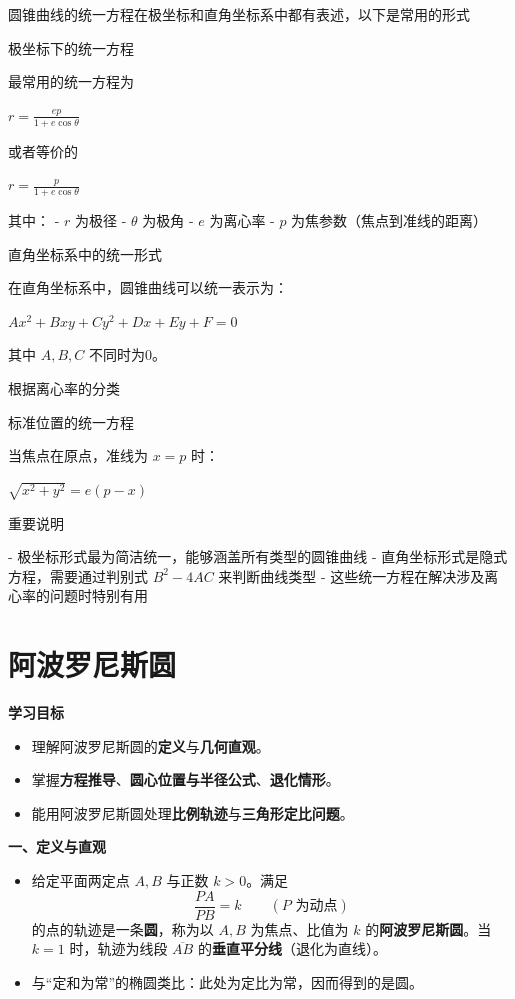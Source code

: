 \documentclass{ctexart}
\begin{document}
   圆锥曲线的统一方程在极坐标和直角坐标系中都有表述，以下是常用的形式
   
    极坐标下的统一方程
   
   最常用的统一方程为
   
  
   $ r = \frac{ep}{1 + e\cos\theta}$
   
   
   或者等价的
   
   $r = \frac{p}{1 + e\cos\theta} $
   
   其中：
   - $r$ 为极径
   - $\theta$ 为极角
   - $e$ 为离心率
   - $p$ 为焦参数（焦点到准线的距离）
   
    直角坐标系中的统一形式
   
   在直角坐标系中，圆锥曲线可以统一表示为：
   
   
   $Ax^2 + Bxy + Cy^2 + Dx + Ey + F = 0$
   
   
   其中 $A, B, C$ 不同时为0。
   
    根据离心率的分类
   
%   
%   
   
   标准位置的统一方程
   
   当焦点在原点，准线为 $x = p$ 时：
   
  
  $ \sqrt{x^2 + y^2} = e(p - x)$
   
   
    重要说明
   
   - 极坐标形式最为简洁统一，能够涵盖所有类型的圆锥曲线
   - 直角坐标形式是隐式方程，需要通过判别式 $B^2 - 4AC$ 来判断曲线类型
   - 这些统一方程在解决涉及离心率的问题时特别有用
   

   
   \section{阿波罗尼斯圆}
   
   \textbf{学习目标}
   \begin{itemize}
   	\item 理解阿波罗尼斯圆的\textbf{定义}与\textbf{几何直观}。
   	\item 掌握\textbf{方程推导}、\textbf{圆心位置与半径公式}、\textbf{退化情形}。
   	\item 能用阿波罗尼斯圆处理\textbf{比例轨迹}与\textbf{三角形定比问题}。
   \end{itemize}
   
   \textbf{一、定义与直观}
   \begin{itemize}
   	\item 给定平面两定点 \(A,B\) 与正数 \(k>0\)。满足
   	\[
   	\frac{PA}{PB}=k \qquad (P \text{ 为动点})
   	\]
   	的点的轨迹是一条\textbf{圆}，称为以 \(A,B\) 为焦点、比值为 \(k\) 的\textbf{阿波罗尼斯圆}。当 \(k=1\) 时，轨迹为线段 \(\overline{AB}\) 的\textbf{垂直平分线}（退化为直线）。
   	\item 与“定和为常”的椭圆类比：此处为\(\textbf{定比为常}\)，因而得到的是圆。
   \end{itemize}
   
\end{document}
